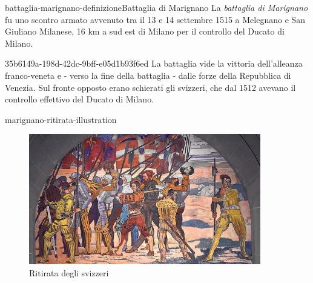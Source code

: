 \documentclass[preview]{standalone}
\begin{document}

\begin{snippetdefinition}{battaglia-marignano-definizione}{Battaglia di Marignano}
    La \textit{battaglia di Marignano} fu uno scontro armato avvenuto tra il 13 e 14
    settembre 1515 a Melegnano e San Giuliano Milanese,
    16 km a sud est di Milano per il controllo del Ducato di Milano. 
\end{snippetdefinition}

\begin{snippet}{35b6149a-198d-42dc-9bff-e05d1b93f6ed}
    La battaglia vide la vittoria dell'alleanza franco-veneta
    e - verso la fine della battaglia - dalle forze della Repubblica di Venezia.
    Sul fronte opposto erano schierati gli svizzeri, che dal 1512 avevano il controllo
    effettivo del Ducato di Milano.
\end{snippet}

\begin{snippet}{marignano-ritirata-illustration}
    \begin{center}
    \begin{figure}[h]
        \centering
        \includegraphics[width=0.9\textwidth]{./resources/marignano_ritirata.png}
        \caption{Ritirata degli svizzeri}
    \end{figure}
    \end{center}
\end{snippet}
\end{document}
